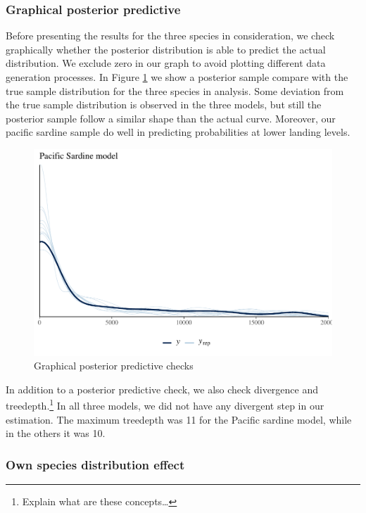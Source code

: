 \documentclass[
]{article}
\begin{document}
\hypertarget{graphical-posterior-predictive}{%
\subsubsection{Graphical posterior
predictive}\label{graphical-posterior-predictive}}

Before presenting the results for the three species in consideration, we
check graphically whether the posterior distribution is able to predict
the actual distribution. We exclude zero in our graph to avoid plotting
different data generation processes. In Figure \ref{fig:posteriors} we
show a posterior sample compare with the true sample distribution for
the three species in analysis. Some deviation from the true sample
distribution is observed in the three models, but still the posterior
sample follow a similar shape than the actual curve. Moreover, our
pacific sardine sample do well in predicting probabilities at lower
landing levels.

\begin{figure}
\centering
\includegraphics{econ_landings_paper_files/figure-latex/y_rep-1.pdf}
\caption{Graphical posterior predictive checks\label{fig:posteriors}}
\end{figure}

In addition to a posterior predictive check, we also check divergence
and treedepth.\footnote{Explain what are these concepts\ldots{}} In all
three models, we did not have any divergent step in our estimation. The
maximum treedepth was 11 for the Pacific sardine model, while in the
others it was 10.

\hypertarget{own-species-distribution-effect}{%
\subsubsection{Own species distribution
effect}\label{own-species-distribution-effect}}
\end{document}
